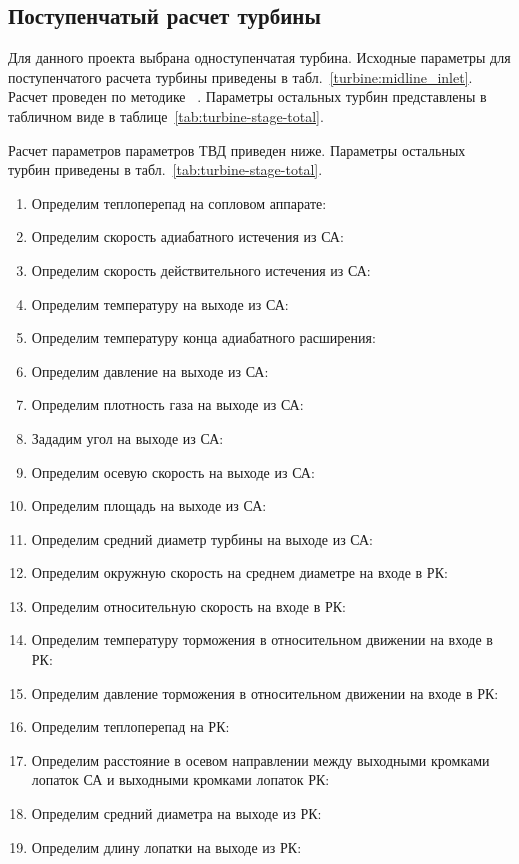 \subsection{Поступенчатый расчет турбины}
Для данного проекта выбрана одноступенчатая турбина.
Исходные параметры для поступенчатого расчета турбины приведены в табл.~\ref{turbine:midline_inlet}.
Расчет проведен по методике ~\cite{gtd_theory_text_book, mikhaltsev_1, mikhaltsev_2}.
Параметры остальных турбин представлены в табличном виде в таблице~\ref{tab:turbine-stage-total}.

Расчет параметров параметров ТВД приведен ниже. Параметры остальных турбин приведены в табл.~\ref{tab:turbine-stage-total}.
\begin{enumerate}
	\item Определим теплоперепад на сопловом аппарате:
	\item Определим скорость адиабатного истечения из СА:
	\item Определим скорость действительного истечения из СА:
	\item Определим температуру на выходе из СА:
	\item Определим температуру конца адиабатного расширения:
	\item Определим давление на выходе из СА:
	\item Определим плотность газа на выходе из СА:
	\item Зададим угол на выходе из СА:
	\item Определим осевую скорость на выходе из СА:
	\item Определим площадь на выходе из СА:
	\item Определим средний диаметр турбины на выходе из СА:
	\item Определим окружную скорость на среднем диаметре на входе в РК:
	\item Определим относительную скорость на входе в РК:
	\item Определим температуру торможения в относительном движении на входе в РК:
	\item Определим давление торможения в относительном движении на входе в РК:
	 \item Определим теплоперепад на РК:
	\item Определим расстояние в осевом направлении между выходными кромками лопаток СА и выходными кромками лопаток РК:
	 \item Определим средний диаметра на выходе из РК:
	 \item Определим длину лопатки на выходе из РК:

\end{enumerate}

